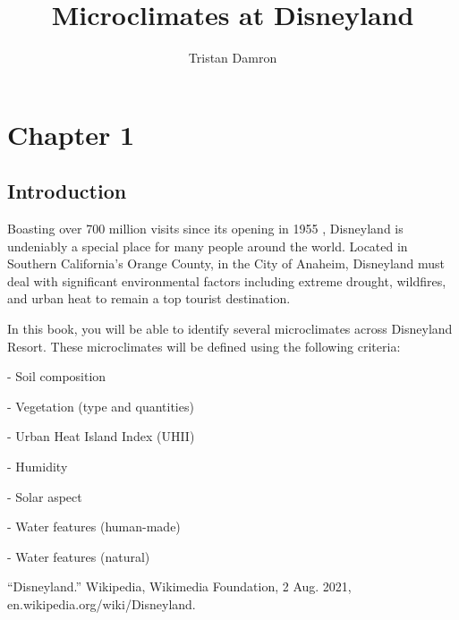 \documentclass[11pt]{report}
\title{\textbf{Microclimates at Disneyland}}
\author{Tristan Damron}
\date{}
\begin{document}
\chapter{Chapter 1}

\section{Introduction}

Boasting over 700 million visits since its opening in 1955 \cite{disneyland}, Disneyland is undeniably a special place for many people around the world. Located in Southern California's Orange County, in the City of Anaheim, Disneyland must deal with significant environmental factors including extreme drought, wildfires, and urban heat to remain a top tourist destination.

In this book, you will be able to identify several microclimates across Disneyland Resort. These microclimates will be defined using the following criteria:

- Soil composition

- Vegetation (type and quantities)

- Urban Heat Island Index (UHII)

- Humidity

- Solar aspect
 
- Water features (human-made)

- Water features (natural)
 

\begin{thebibliography}{9}

“Disneyland.” Wikipedia, Wikimedia Foundation, 2 Aug. 2021, en.wikipedia.org/wiki/Disneyland. 
\end{thebibliography}
\end{document}
